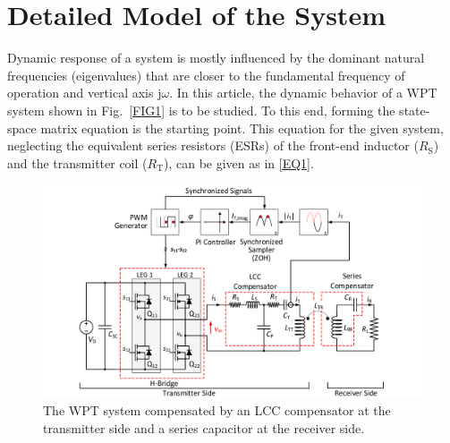 \documentclass[journal,a4paper,10pt,twoside]{IEEEtran} %
\begin{document}
	\section{Detailed Model of the System}
	
	Dynamic response of a system is mostly influenced by the dominant natural frequencies (eigenvalues) that are closer to the fundamental frequency of operation and vertical axis $\mathrm{j}\omega$. {\color{blue}In this article}, the dynamic behavior of a WPT system shown in Fig.~\ref{FIG1} is to be studied. To this end, forming the state-space matrix equation is the starting point. This equation for the given system, neglecting the equivalent series resistors (ESRs) of the front-end inductor ($R_\mathrm{S}$) and the transmitter coil ($R_\mathrm{T}$), can be given as in \eqref{EQ1}.
	
	\begin{figure}
	    \centering
	    \includegraphics[clip, trim=3cm 0.25cm 3cm 0.25cm, width=1\columnwidth]{FIGS/FIG2.pdf}
	    \vspace{-5mm}
	    \caption{The WPT system compensated by an LCC compensator at the transmitter side and a series capacitor at the receiver side.}
	    \label{FIG2}
	    \vspace{-3mm}
	\end{figure}
	
\end{document}
